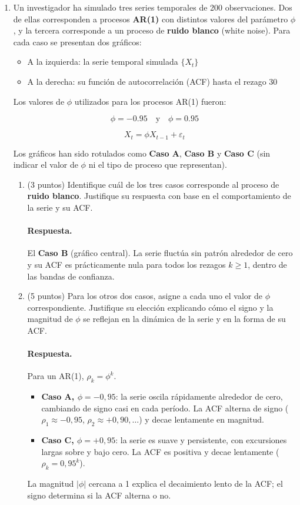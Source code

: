 \documentclass[letterpaper,11pt]{article}
\newcommand{\respuesta}{\color{blue}\paragraph{Respuesta.}}
\newcommand{\fin}{\color{black}}
\begin{document}
\begin{enumerate}
\item\color{black} Un investigador ha simulado tres series temporales de 200 observaciones. Dos de ellas corresponden a procesos \textbf{AR(1)} con distintos valores del parámetro \( \phi \), y la tercera corresponde a un proceso de \textbf{ruido blanco} (white noise). Para cada caso se presentan dos gráficos:

\begin{itemize}
    \item A la izquierda: la serie temporal simulada \( \{X_t\} \)
    \item A la derecha: su función de autocorrelación (ACF) hasta el rezago 30
\end{itemize}

Los valores de \( \phi \) utilizados para los procesos AR(1) fueron:

\[
\phi = -0.95 \quad \text{y} \quad \phi = 0.95
\]

\[
X_t = \phi X_{t-1} + \varepsilon_t
\]

Los gráficos han sido rotulados como \textbf{Caso A}, \textbf{Caso B} y \textbf{Caso C} (sin indicar el valor de \( \phi \) ni el tipo de proceso que representan).

\begin{enumerate}
    \item (3 puntos) Identifique cuál de los tres casos corresponde al proceso de \textbf{ruido blanco}. Justifique su respuesta con base en el comportamiento de la serie y su ACF.

    \respuesta El \textbf{Caso B} (gráfico central). La serie fluctúa sin patrón
    alrededor de cero y su ACF es prácticamente nula para todos los rezagos
    $k\geq1$, dentro de las bandas de confianza.
    \fin

    \item (5 puntos) Para los otros dos casos, asigne a cada uno el valor de \( \phi \) correspondiente. Justifique su elección explicando cómo el signo y la magnitud de \( \phi \) se reflejan en la dinámica de la serie y en la forma de su ACF.

    \respuesta Para un AR(1), $\rho_k=\phi^k$.
    \begin{itemize}
        \item \textbf{Caso A, $\phi=-0{,}95$}: la serie oscila rápidamente
        alrededor de cero, cambiando de signo casi en cada período. La ACF
        alterna de signo ($\rho_1\approx-0{,}95$, $\rho_2\approx+0{,}90,\dots$) y
        decae lentamente en magnitud.
        \item \textbf{Caso C, $\phi=+0{,}95$}: la serie es suave y persistente,
        con excursiones largas sobre y bajo cero. La ACF es positiva y decae
        lentamente ($\rho_k=0{,}95^k$).
    \end{itemize}
    La magnitud $|\phi|$ cercana a 1 explica el decaimiento lento de la ACF; el
    signo determina si la ACF alterna o no.
    \fin


\end{enumerate}
\end{enumerate}
\end{document}
